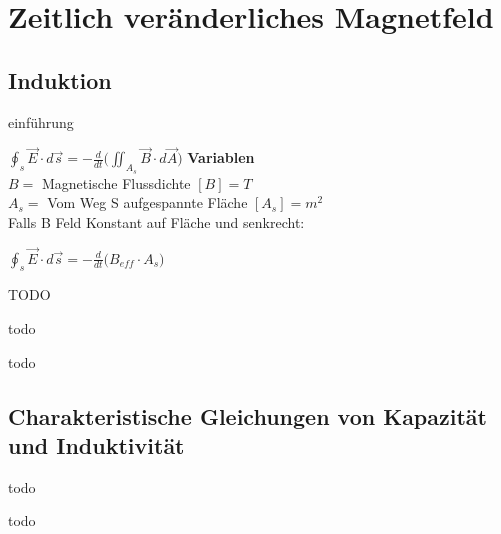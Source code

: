 %
%
%
%
%
\newpage
\section{Zeitlich veränderliches Magnetfeld}
\subsection{Induktion}

einführung

\begingl
\formulaBegin
  $\displaystyle \oint_s \vec{E}\cdot d\vec{s} = -\frac{d}{dt} \big ( \iint_{A_s} \vec{B} \cdot d\vec{A} \big )$
\formulaEnd
\textbf{Variablen} \\
$B = $ Magnetische Flussdichte $[B] = T$\\
$A_s = $ Vom Weg S aufgespannte Fläche $[A_s] = m^2$ \\

Falls B Feld Konstant auf Fläche und senkrecht:

\formulaBegin
  $\displaystyle  \oint_s \vec{E}\cdot d\vec{s} = -\frac{d}{dt} \big ( B_{eff} \cdot A_s \big ) $
\formulaEnd
\iend

\beginip
\iend

\beginbsp
TODO
\iend

\beginip
todo
\iend


\beginip
todo
\iend


\subsection{Charakteristische Gleichungen von Kapazität und Induktivität}
\begingl
todo
\iend

\begingl
todo
\iend
